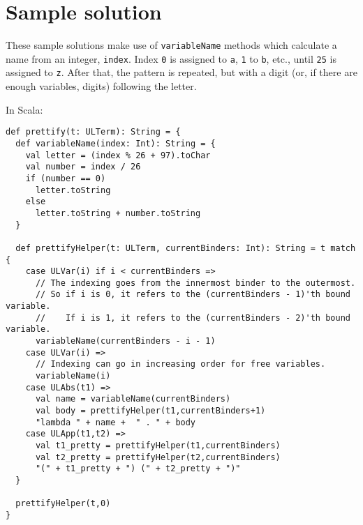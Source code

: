 \documentclass[11pt]{article}
\begin{document}
\section*{Sample solution}
\label{sec:orgcd0d0b5}
These sample solutions make use of \texttt{variableName} methods
which calculate a name from an integer, \texttt{index}.
Index \texttt{0} is assigned to \texttt{a}, \texttt{1} to \texttt{b}, etc., until \texttt{25} is assigned to \texttt{z}.
After that, the pattern is repeated, but with a digit
(or, if there are enough variables, digits)
following the letter.

In Scala:
\begin{verbatim}
def prettify(t: ULTerm): String = {
  def variableName(index: Int): String = {
    val letter = (index % 26 + 97).toChar
    val number = index / 26
    if (number == 0)
      letter.toString
    else
      letter.toString + number.toString
  }
  
  def prettifyHelper(t: ULTerm, currentBinders: Int): String = t match {
    case ULVar(i) if i < currentBinders =>
      // The indexing goes from the innermost binder to the outermost.
      // So if i is 0, it refers to the (currentBinders - 1)'th bound variable.
      //    If i is 1, it refers to the (currentBinders - 2)'th bound variable.
      variableName(currentBinders - i - 1)
    case ULVar(i) =>
      // Indexing can go in increasing order for free variables.
      variableName(i)
    case ULAbs(t1) =>
      val name = variableName(currentBinders)
      val body = prettifyHelper(t1,currentBinders+1)
      "lambda " + name +  " . " + body 
    case ULApp(t1,t2) =>
      val t1_pretty = prettifyHelper(t1,currentBinders)
      val t2_pretty = prettifyHelper(t2,currentBinders)
      "(" + t1_pretty + ") (" + t2_pretty + ")"
  }

  prettifyHelper(t,0)
}
\end{verbatim}
\end{document}
